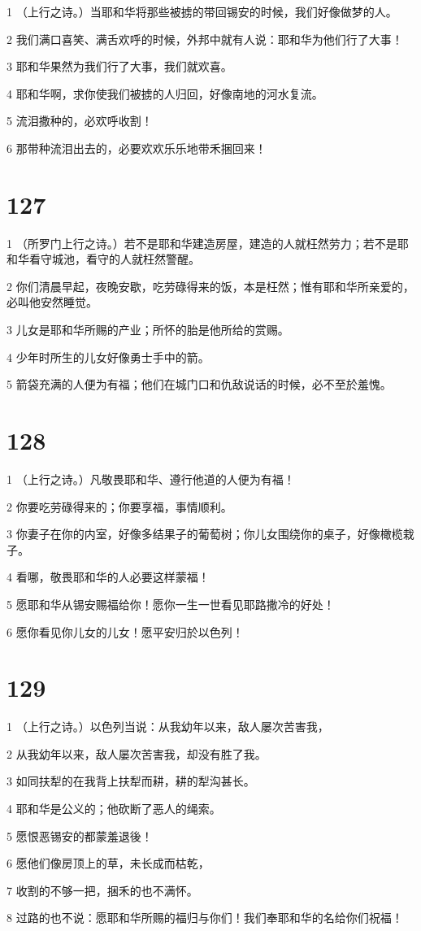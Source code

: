 \par 1 （上行之诗。）当耶和华将那些被掳的带回锡安的时候，我们好像做梦的人。
\par 2 我们满口喜笑、满舌欢呼的时候，外邦中就有人说：耶和华为他们行了大事！
\par 3 耶和华果然为我们行了大事，我们就欢喜。
\par 4 耶和华啊，求你使我们被掳的人归回，好像南地的河水复流。
\par 5 流泪撒种的，必欢呼收割！
\par 6 那带种流泪出去的，必要欢欢乐乐地带禾捆回来！

\chapter{127}

\par 1 （所罗门上行之诗。）若不是耶和华建造房屋，建造的人就枉然劳力；若不是耶和华看守城池，看守的人就枉然警醒。
\par 2 你们清晨早起，夜晚安歇，吃劳碌得来的饭，本是枉然；惟有耶和华所亲爱的，必叫他安然睡觉。
\par 3 儿女是耶和华所赐的产业；所怀的胎是他所给的赏赐。
\par 4 少年时所生的儿女好像勇士手中的箭。
\par 5 箭袋充满的人便为有福；他们在城门口和仇敌说话的时候，必不至於羞愧。

\chapter{128}

\par 1 （上行之诗。）凡敬畏耶和华、遵行他道的人便为有福！
\par 2 你要吃劳碌得来的；你要享福，事情顺利。
\par 3 你妻子在你的内室，好像多结果子的葡萄树；你儿女围绕你的桌子，好像橄榄栽子。
\par 4 看哪，敬畏耶和华的人必要这样蒙福！
\par 5 愿耶和华从锡安赐福给你！愿你一生一世看见耶路撒冷的好处！
\par 6 愿你看见你儿女的儿女！愿平安归於以色列！

\chapter{129}

\par 1 （上行之诗。）以色列当说：从我幼年以来，敌人屡次苦害我，
\par 2 从我幼年以来，敌人屡次苦害我，却没有胜了我。
\par 3 如同扶犁的在我背上扶犁而耕，耕的犁沟甚长。
\par 4 耶和华是公义的；他砍断了恶人的绳索。
\par 5 愿恨恶锡安的都蒙羞退後！
\par 6 愿他们像房顶上的草，未长成而枯乾，
\par 7 收割的不够一把，捆禾的也不满怀。
\par 8 过路的也不说：愿耶和华所赐的福归与你们！我们奉耶和华的名给你们祝福！

